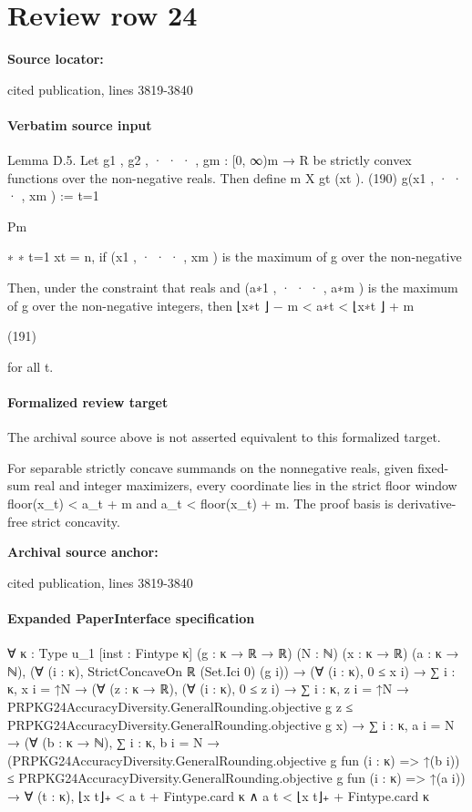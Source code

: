 \documentclass[10pt]{article}
\begin{document}
\section*{Review row 24}
\textbf{Source locator:} {\footnotesize\raggedright cited publication, lines 3819-\allowbreak{}3840\par}
\paragraph{Verbatim source input}
\begin{ReviewVerbatim}
Lemma D.5. Let g1 , g2 , · · · , gm : [0, ∞)m → R be strictly convex functions over the non-negative reals. Then
define
m
X
gt (xt ).
(190)
g(x1 , · · · , xm ) :=
t=1

Pm

∗
∗
t=1 xt = n, if (x1 , · · · , xm ) is the maximum of g over the non-negative

Then, under the constraint that
reals and (a∗1 , · · · , a∗m ) is the maximum of g over the non-negative integers, then
⌊x∗t ⌋ − m < a∗t < ⌊x∗t ⌋ + m

(191)

for all t.
\end{ReviewVerbatim}


\paragraph{Formalized review target}
The archival source above is not asserted equivalent to this formalized target.
\begin{ReviewVerbatim}
For separable strictly concave summands on the nonnegative reals, given fixed-sum real and integer maximizers, every coordinate lies in the strict floor window floor(x_t) < a_t + m and a_t < floor(x_t) + m. The proof basis is derivative-free strict concavity.
\end{ReviewVerbatim}

\textbf{Archival source anchor:} {\footnotesize\raggedright cited publication, lines 3819-\allowbreak{}3840\par}
\paragraph{Expanded PaperInterface specification}
\begin{ReviewVerbatim}
∀ {κ : Type u_1} [inst : Fintype κ] (g : κ → ℝ → ℝ) (N : ℕ) (x : κ → ℝ) (a : κ → ℕ),
  (∀ (i : κ), StrictConcaveOn ℝ (Set.Ici 0) (g i)) →
    (∀ (i : κ), 0 ≤ x i) →
      ∑ i : κ, x i = ↑N →
        (∀ (z : κ → ℝ),
            (∀ (i : κ), 0 ≤ z i) →
              ∑ i : κ, z i = ↑N →
                PRPKG24AccuracyDiversity.GeneralRounding.objective g z ≤
                  PRPKG24AccuracyDiversity.GeneralRounding.objective g x) →
          ∑ i : κ, a i = N →
            (∀ (b : κ → ℕ),
                ∑ i : κ, b i = N →
                  (PRPKG24AccuracyDiversity.GeneralRounding.objective g fun (i : κ) => ↑(b i)) ≤
                    PRPKG24AccuracyDiversity.GeneralRounding.objective g fun (i : κ) => ↑(a i)) →
              ∀ (t : κ), ⌊x t⌋₊ < a t + Fintype.card κ ∧ a t < ⌊x t⌋₊ + Fintype.card κ
\end{ReviewVerbatim}
\end{document}
